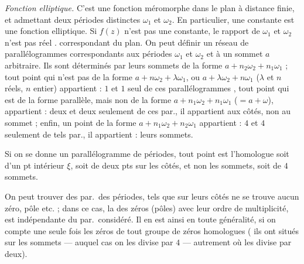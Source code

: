 \documentclass[11pt,a4paper]{article}
\begin{document}
\emph{Fonction elliptique.} C'est une fonction méromorphe dans le plan à
distance finie, et admettant deux périodes distinctes $\omega_1$ et $\omega_2$.
\struck{\ill{}} En particulier, une constante est une fonction elliptique. Si
$f(z)$ n'est pas une constante, le rapport de $\omega_1$ et $\omega_2$ n'est pas
réel .
 correspondant du plan. On peut définir un réseau de parallélogrammes
correspondants aux périodes $\omega_1$ et $\omega_2$ et à un sommet $a$ arbitraire.
Ils sont déterminés par leurs sommets de la forme $a+n_2\omega_2+n_1\omega_1$ ;
tout point qui n'est pas de la forme $a+n\omega_2+\lambda\omega_1$, ou
$a+\lambda\omega_2+n\omega_1$ ($\lambda$ et $n$ réels, $n$ entier) appartient : $1$
et $1$ seul de ces parallélogrammes  \struck{\ill{}},
tout point qui est de la forme parallèle, mais non de la forme
$a+n_1\omega_2+n_1\omega_1$ ($=a+\omega$), \struck{\ill{}} appartient : deux et
deux seulement de ces par., il appartient aux côtés, non au sommet ; enfin, un
point de la forme $a+n_1\omega_2+n_2\omega_1$ appartient : $4$ et $4$ seulement de
tels par., il appartient : leurs sommets.

Si on se donne un parallélogramme de périodes, tout point est l'homologue soit
d'un pt intérieur $\xi$, soit de deux pts sur les côtés, et non les sommets,
soit de $4$ sommets.

On peut trouver des par.\ des périodes, tels que sur leurs côtés ne se trouve
aucun zéro, pôle etc. ; dans ce cas, la \struck{\ill{}}  des zéros
(pôles) avec leur ordre de multiplicité, est indépendante du par.\ considéré. Il
en est ainsi en toute généralité, si on compte une seule fois
\struck{\ill{}} les zéros de tout groupe de zéros homologues
( ils ont situés sur les sommets --- auquel cas on les divise par
$4$ --- autrement où les divise par deux).
\end{document}
